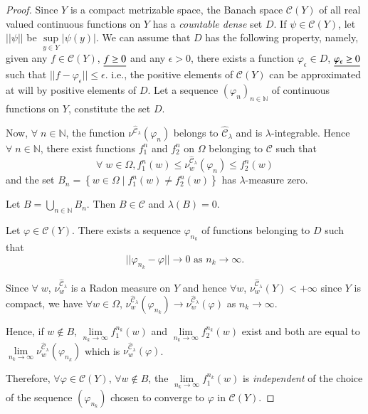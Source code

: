 \begin{proof}
Since $Y$ is a compact metrizable space, the Banach space
$\mathscr{C}(Y)$ of all real valued continuous functions on $Y$ has a
{\em countable dense} set $D$. If $\psi \in  \mathscr{C}(Y)$, let
$||\psi||$ be $\sup\limits_{y \in Y} |\psi (y)|$. We can assume that
$D$ has the following property, namely, given any $f \in
\mathscr{C}(Y)$, $\underline{f \geq 0}$ and any $\epsilon > 0$, there exists a
function $\varphi_\epsilon \in D$, $\underline{\varphi_\epsilon \geq 0}$ such
that $||f - \varphi_\epsilon|| \leq \epsilon$. i.e., the positive
elements of $\mathscr{C}(Y)$ can be approximated at will by positive
elements of $D$. Let a sequence $(\varphi_n)_{n \in \mathbb{N}}$ of
continuous functions on $Y$, constitute the set $D$. 

Now, $\forall \; n \in \mathbb{N}$, the function
$\nu^{\hat{\mathscr{C}}_\lambda} (\varphi_n)$ belongs to
$\hat{\mathscr{C}}_\lambda$ and is $\lambda$-integra\-ble. Hence
$\forall \; n \in \mathbb{N}$, there exist functions $f^n_1$ and
$f^n_2$ on $\Omega$ belonging to $\mathscr{C}$ such that 
$$
\forall \; w \in \Omega, f^n_1 (w) \leq
\nu^{\hat{\mathscr{C}}_\lambda}_w (\varphi_n) \leq f^n_2 (w)
$$\pageoriginale
and the set $B_n = \left\{ w \in\Omega \mid f^n_1(w) \neq f^n_2 (w)
\right\}$ has $\lambda$-measure zero. 

Let $B = \bigcup\limits_{n \in \mathbb{N}} B_n$. Then $B \in
\mathscr{C}$ and $\lambda(B) = 0$. 

Let $\varphi \in \mathscr{C} (Y)$. There exists a sequence
$\varphi_{n_k}$ of functions belonging to $D$ such that 
$$
|| \varphi_{n_k} - \varphi|| \to 0 \text{ as } n_k \to \infty. 
$$

Since $\forall \; w$, $\nu^{\hat{\mathscr{C}}_\lambda}_w$ is a Radon
measure on $Y$ and hence $\forall w$,
$\nu^{\hat{\mathscr{C}}_\lambda}_w (Y) < + \infty $ since $Y$ is
compact, we have $\forall w \in \Omega$,
$\nu^{\hat{\mathscr{C}}_\lambda}_w (\varphi_{n_k}) \to
\nu^{\hat{\mathscr{C}}_\lambda}_w (\varphi)$ as $n_k \to \infty$.

Hence, if $w \not\in B$, $\lim\limits_{n_k \to \infty} f^{n_k}_1(w)$
and $\lim\limits_{n_k \to \infty} f^{n_k}_2 (w) $ exist and both are
equal to $\lim\limits_{n_k \to \infty}
\nu^{\hat{\mathscr{C}}_\lambda}_w (\varphi_{n_k})$ which is
$\nu^{\hat{\mathscr{C}}_\lambda}_w (\varphi) $. 

Therefore, $\forall \varphi \in \mathscr{C}(Y)$, $\forall w \not\in
B$, the $\lim\limits_{n_k \to \infty} f^{n_k}_1(w)$ is {\em
  independent} of the choice of the sequence $(\varphi_{n_k})$ chosen
to converge to $\varphi$ in $\mathscr{C}(Y)$. 


\end{proof}
